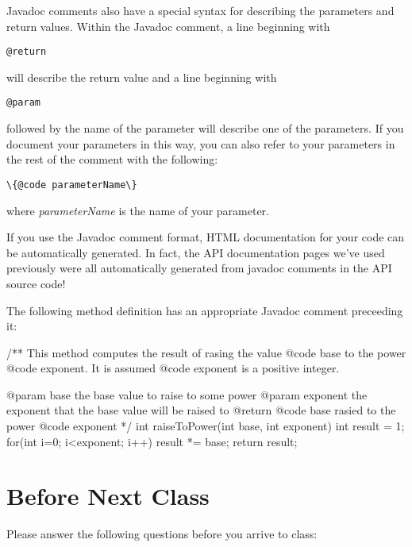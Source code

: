 Javadoc comments also have a special syntax for describing the parameters and return values. Within the Javadoc comment, a line beginning with \begin{verbatim}@return\end{verbatim} will describe the return value and a line beginning with \begin{verbatim}@param\end{verbatim} followed by the name of the parameter will describe one of the parameters. If you document your parameters in this way, you can also refer to your parameters in the rest of the comment with the following: \begin{verbatim}\{@code parameterName\}\end{verbatim} where \textit{parameterName} is the name of your parameter. 

If you use the Javadoc comment format, HTML documentation for your code can be automatically generated. In fact, the API documentation pages we've used previously were all automatically generated from javadoc comments in the API source code!

\newpage

\begin{exa}
The following method definition has an appropriate Javadoc comment preceeding it:

\begin{code}
/** This method computes the result of rasing the value {@code base} to the power {@code exponent}.
    It is assumed {@code exponent} is a positive integer.
    
    @param base the base value to raise to some power
    @param exponent the exponent that the base value will be raised to
    @return {@code base} rasied to the power {@code exponent}
*/
int raiseToPower(int base, int exponent) {
  int result = 1;
  for(int i=0; i<exponent; i++) { 
    result *= base;
  } 
  return result;
}
\end{code}
\end{exa}

\section{Before Next Class}

Please answer the following questions before you arrive to class:

